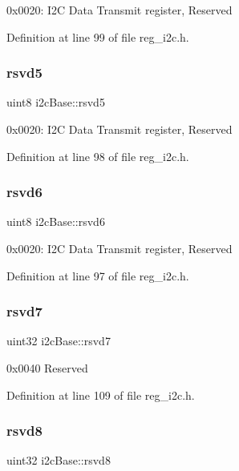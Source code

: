 0x0020\+: I2C Data Transmit register, Reserved 

Definition at line 99 of file reg\+\_\+i2c.\+h.

\mbox{\label{structi2cBase_a2a59cdb9e119ba17be8553574dd2133c}} 
\subsubsection{\texorpdfstring{rsvd5}{rsvd5}}
{\footnotesize\ttfamily uint8 i2c\+Base\+::rsvd5}

0x0020\+: I2C Data Transmit register, Reserved 

Definition at line 98 of file reg\+\_\+i2c.\+h.

\mbox{\label{structi2cBase_a6d7693e55195ed7c6326c674487611d8}} 
\subsubsection{\texorpdfstring{rsvd6}{rsvd6}}
{\footnotesize\ttfamily uint8 i2c\+Base\+::rsvd6}

0x0020\+: I2C Data Transmit register, Reserved 

Definition at line 97 of file reg\+\_\+i2c.\+h.

\mbox{\label{structi2cBase_ac461e9e170ef430025c672720cd8dc25}} 
\subsubsection{\texorpdfstring{rsvd7}{rsvd7}}
{\footnotesize\ttfamily uint32 i2c\+Base\+::rsvd7}

0x0040 Reserved 

Definition at line 109 of file reg\+\_\+i2c.\+h.

\mbox{\label{structi2cBase_a10a534e6efbb4b1088a2d096869b97e5}} 
\subsubsection{\texorpdfstring{rsvd8}{rsvd8}}
{\footnotesize\ttfamily uint32 i2c\+Base\+::rsvd8}

